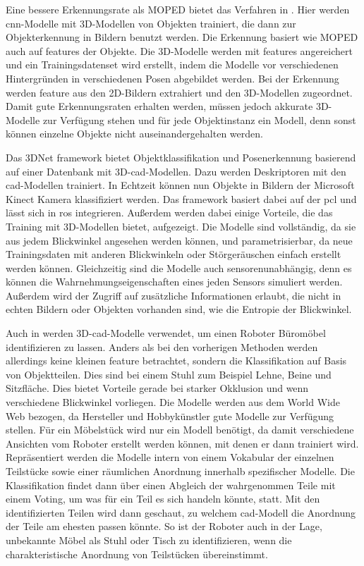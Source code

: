 Eine bessere Erkennungsrate als MOPED bietet das Verfahren in \cite{3DCNNObjRec}. Hier werden \gls{cnn}-Modelle mit 3D-Modellen von Objekten trainiert, die dann zur Objekterkennung in Bildern benutzt werden. Die Erkennung basiert wie MOPED auch auf \glspl{feature} der Objekte. Die 3D-Modelle werden mit \glspl{feature} angereichert und ein Trainingsdatenset wird erstellt, indem die Modelle vor verschiedenen Hintergründen in verschiedenen Posen abgebildet werden. Bei der Erkennung werden \gls{feature} aus den 2D-Bildern extrahiert und den 3D-Modellen zugeordnet. Damit gute Erkennungsraten erhalten werden, müssen jedoch akkurate 3D-Modelle zur Verfügung stehen und für jede Objektinstanz ein Modell, denn sonst können einzelne Objekte nicht auseinandergehalten werden.   \par

Das 3DNet \gls{framework} \cite{3dnet} bietet Objektklassifikation und Posenerkennung basierend auf einer Datenbank mit 3D-\gls{cad}-Modellen. Dazu werden Deskriptoren mit den \gls{cad}-Modellen trainiert. In Echtzeit können nun Objekte in Bildern der Microsoft Kinect Kamera klassifiziert werden. Das \gls{framework} basiert dabei auf der \gls{pcl}\cite{pcl} und lässt sich in \acrshort{ros} integrieren. Außerdem werden dabei einige Vorteile, die das Training mit 3D-Modellen bietet, aufgezeigt. Die Modelle sind vollständig, da sie aus jedem Blickwinkel angesehen werden können, und parametrisierbar, da neue Trainingsdaten mit anderen Blickwinkeln oder Störgeräuschen einfach erstellt werden können. Gleichzeitig sind die Modelle auch sensorenunabhängig, denn es können die Wahrnehmungseigenschaften eines jeden Sensors simuliert werden. Außerdem wird der Zugriff auf zusätzliche Informationen erlaubt, die nicht in echten Bildern oder Objekten vorhanden sind, wie die Entropie der Blickwinkel.  \par 

Auch in \citep{modelsWWW} werden 3D-\gls{cad}-Modelle verwendet, um einen Roboter Büromöbel identifizieren zu lassen. Anders als bei den vorherigen Methoden werden allerdings keine kleinen \gls{feature} betrachtet, sondern die Klassifikation auf Basis von Objektteilen. Dies sind bei einem Stuhl zum Beispiel Lehne, Beine und Sitzfläche. Dies bietet Vorteile gerade bei starker Okklusion und wenn verschiedene Blickwinkel vorliegen. Die Modelle werden aus dem World Wide Web bezogen, da Hersteller und Hobbykünstler gute Modelle zur Verfügung stellen. Für ein Möbelstück wird nur ein Modell benötigt, da damit verschiedene Ansichten vom Roboter erstellt werden können, mit denen er dann trainiert wird. Repräsentiert werden die Modelle intern von einem Vokabular der einzelnen Teilstücke sowie einer räumlichen Anordnung innerhalb spezifischer Modelle. Die Klassifikation findet dann über einen Abgleich der wahrgenommen Teile mit einem Voting, um was für ein Teil es sich handeln könnte, statt. Mit den identifizierten Teilen wird dann geschaut, zu welchem \gls{cad}-Modell die Anordnung der Teile am ehesten passen könnte. So ist der Roboter auch in der Lage, unbekannte Möbel als Stuhl oder Tisch zu identifizieren, wenn die charakteristische Anordnung von Teilstücken übereinstimmt.   

